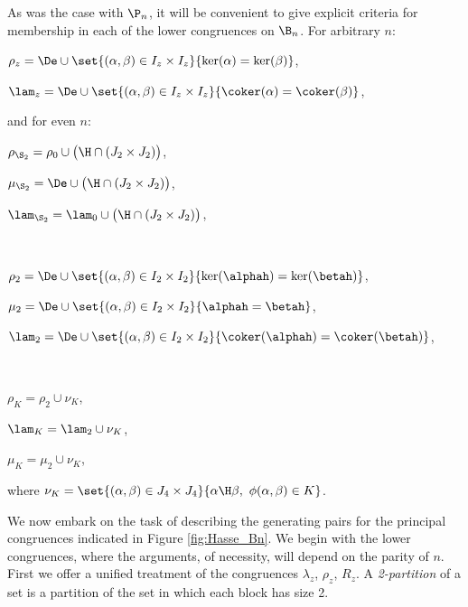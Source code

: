 As was the case with $\P_n$, it will be convenient to give explicit criteria for membership in each of the lower congruences on $\B_n$.  For arbitrary $n$:
\begin{itemize}\begin{multicols}{2}
\item $\rho_z=\De \cup \set{(\alpha,\beta)\in I_z\times I_z}{\ker(\alpha)=\ker(\beta)}$,

\item $\lam_z=\De \cup \set{(\alpha,\beta)\in I_z\times I_z}{\coker(\alpha)=\coker(\beta)}$,
\end{multicols}\end{itemize}
and for even $n$:
\begin{itemize}
\begin{multicols}{2}
\item $\rho_{\S_2}=\rho_0\cup\big( {\H}\cap(J_2\times J_2)\big)$,
\item $\mu_{\S_2}=\De\cup\big( {\H}\cap(J_2\times J_2)\big)$,
\item $\lam_{\S_2}=\lam_0\cup\big( {\H}\cap(J_2\times J_2)\big)$,
\item[] ~
\end{multicols}
\begin{multicols}{2}
\item $\rho_2=\De\cup\set{(\alpha,\beta)\in I_2\times I_2}{\ker(\alphah)=\ker(\betah)}$,
\item $\mu_2=\De\cup\set{(\alpha,\beta)\in I_2\times I_2}{\alphah=\betah}$,
\item $\lam_2=\De\cup\set{(\alpha,\beta)\in I_2\times I_2}{\coker(\alphah)=\coker(\betah)}$,
\item[] ~
\end{multicols}
\begin{multicols}{3}
\item $\rho_K=\rho_2\cup\nu_K$,
\item $\lam_K=\lam_2\cup\nu_K$,
\item $\mu_K=\mu_2\cup\nu_K$,
\end{multicols}
\end{itemize}
where $\nu_K=\set{(\alpha,\beta)\in J_4\times J_4}{\alpha\H\beta,\ \phi(\alpha,\beta)\in K}$.

We now embark on the task of describing the generating pairs for the principal congruences indicated in Figure \ref{fig:Hasse_Bn}.
We begin with the lower congruences, where the arguments, of necessity, will depend on the parity of $n$. First we offer a unified treatment of the congruences $\lambda_z$, $\rho_z$, $R_z$.  A \emph{2-partition} of a set is a partition of the set in which each block has size 2.


